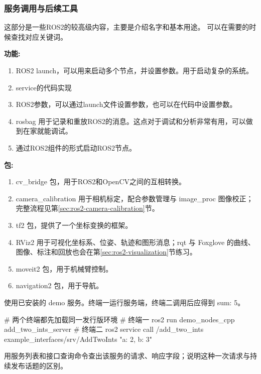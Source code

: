 \subsubsection{服务调用与后续工具}
这部分是一些ROS2的较高级内容，主要是介绍名字和基本用途。
可以在需要的时候查找对应关键词。

\textbf{功能:}
\begin{enumerate}
    \item ROS2 launch，可以用来启动多个节点，并设置参数。用于启动复杂的系统。
    \item service的代码实现
    \item ROS2参数，可以通过launch文件设置参数，也可以在代码中设置参数。
    \item rosbag 用于记录和重放ROS2的消息。这点对于调试和分析非常有用，可以做到在家就能调试。
    \item 通过ROS2组件的形式启动ROS2节点。
\end{enumerate}

\textbf{包:}
\begin{enumerate}
    \item cv\_bridge 包，用于ROS2和OpenCV之间的互相转换。
    \item camera\_calibration 用于相机标定，配合参数管理与 image\_proc 图像校正；完整流程见第\ref{sec:ros2-camera-calibration}节。
    \item tf2 包，提供了一个坐标变换的框架。
    \item RViz2 用于可视化坐标系、位姿、轨迹和图形消息；rqt 与 Foxglove 的曲线、图像、标注和回放也会在第\ref{sec:ros2-visualization}节练习。
    \item moveit2 包，用于机械臂控制。
    \item navigation2 包，用于导航。
\end{enumerate}

\begin{example}
使用已安装的 demo 服务。终端一运行服务端，终端二调用后应得到 sum: 5。
\par\medskip\noindent\begin{minipage}{\linewidth}
\begin{tbash}
# 两个终端都先加载同一发行版环境
# 终端一
ros2 run demo_nodes_cpp add_two_ints_server
# 终端二
ros2 service call /add_two_ints example_interfaces/srv/AddTwoInts "{a: 2, b: 3}"
\end{tbash}
\end{minipage}\par\smallskip
\end{example}

\begin{exercise}
\label{ex:v2-ros-service}
用服务列表和接口查询命令查出该服务的请求、响应字段；说明这种一次请求与持续发布话题的区别。
\end{exercise}

